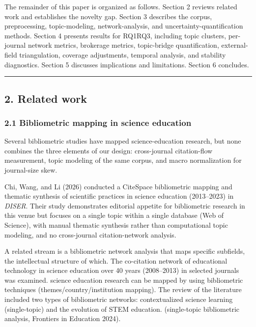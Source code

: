 \documentclass[pdflatex,sn-apa]{sn-jnl}
\newcounter{none}
\begin{document}
The remainder of this paper is organized as follows. Section 2 reviews
related work and establishes the novelty gap. Section 3 describes the
corpus, preprocessing, topic-modeling, network-analysis, and
uncertainty-quantification methods. Section 4 presents results for
RQ1RQ3, including topic clusters, per-journal network metrics, brokerage
metrics, topic-bridge quantification, external-field triangulation,
coverage adjustments, temporal analysis, and stability diagnostics.
Section 5 discusses implications and limitations. Section 6 concludes.

\begin{center}\rule{0.5\linewidth}{0.5pt}\end{center}

\subsection{2. Related work}\label{related-work}

\subsubsection{2.1 Bibliometric mapping in science
education}\label{bibliometric-mapping-in-science-education}

Several bibliometric studies have mapped science-education research, but
none combines the three elements of our design: cross-journal
citation-flow measurement, topic modeling of the same corpus, and macro
normalization for journal-size skew.

Chi, Wang, and Li (2026) conducted a CiteSpace bibliometric mapping and
thematic synthesis of scientific practices in science education
(2013--2023) in \emph{DISER}. Their study demonstrates editorial
appetite for bibliometric research in this venue but focuses on a single
topic within a single database (Web of Science), with manual thematic
synthesis rather than computational topic modeling, and no cross-journal
citation-network analysis.

A related stream is a bibliometric network analysis that maps specific
subfields, the intellectual structure of which. The co-citation network
of educational technology in science education over 40 years
(2008--2013) in selected journals was examined. science education
research can be mapped by using bibliometric techniques
(themes/country/institution mapping). The review of the literature
included two types of bibliometric networks: contextualized science
learning (single-topic) and the evolution of STEM education.
(single-topic bibliometric analysis, Frontiers in Education 2024).
\end{document}
